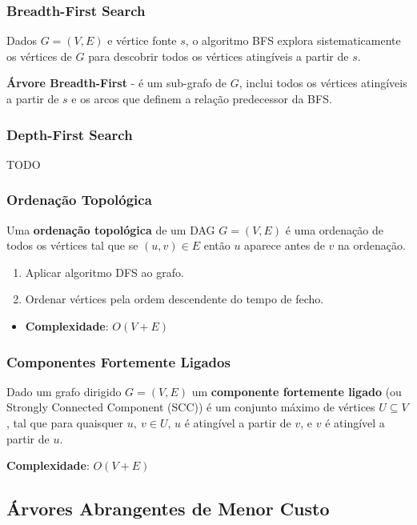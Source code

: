 \documentclass[11pt]{article}
\begin{document}
\subsubsection{Breadth-First Search}

Dados $G = (V,E)$ e vértice fonte $s$, o algoritmo BFS explora
sistematicamente os vértices de $G$ para descobrir todos os vértices
atingíveis a partir de $s$.

\textbf{Árvore Breadth-First} - é um sub-grafo de $G$, inclui todos os vértices atingíveis a partir de $s$ e os arcos que definem a relação predecessor da BFS.

\subsubsection{Depth-First Search}

TODO

\subsubsection{Ordenação Topológica}

Uma \textbf{ordenação topológica} de um DAG $G = (V,E)$ é uma ordenação de
todos os vértices tal que se $(u,v) \in E$ então $u$ aparece antes de $v$ na
ordenação.

\begin{enumerate}[topsep=0pt]
    \item Aplicar algoritmo DFS ao grafo.
    \item Ordenar vértices pela ordem descendente do tempo de fecho.
\end{enumerate}
\begin{itemize}[topsep=0pt]
    \item \textbf{Complexidade}: $O(V+E)$
\end{itemize}


\subsubsection{Componentes Fortemente Ligados}

Dado um grafo dirigido $G = (V,E)$ um \textbf{componente fortemente ligado} (ou Strongly Connected Component (SCC)) é um conjunto máximo de vértices $U \subseteq V$, tal que para quaisquer $u,\ v \in U$, $u$ é atingível a partir de $v$, e $v$ é atingível a partir de $u$.

\textbf{Complexidade}: $O(V+E)$

\subsection{Árvores Abrangentes de Menor Custo} 
\end{document}
